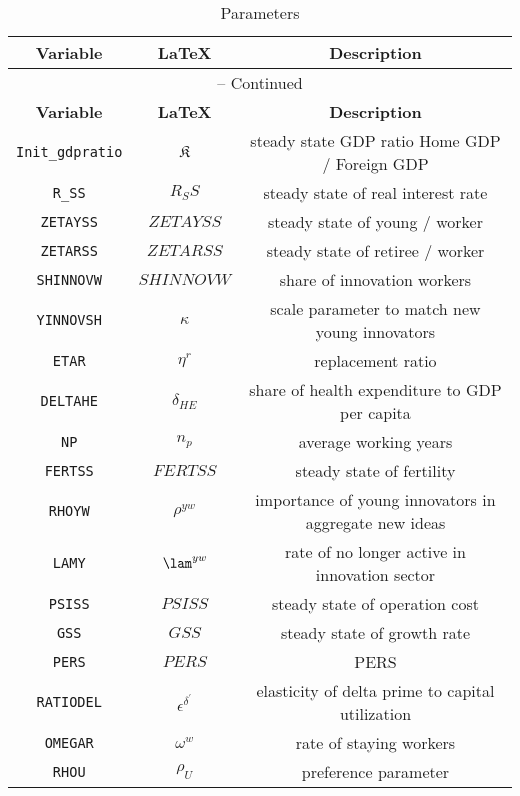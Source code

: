 \begin{center}
\begin{longtable}{ccc}
\caption{Parameters}\\%
\hline%
\multicolumn{1}{c}{\textbf{Variable}} &
\multicolumn{1}{c}{\textbf{\LaTeX}} &
\multicolumn{1}{c}{\textbf{Description}}\\%
\hline\hline%
\endfirsthead
\multicolumn{3}{c}{{\tablename} \thetable{} -- Continued}\\%
\hline%
\multicolumn{1}{c}{\textbf{Variable}} &
\multicolumn{1}{c}{\textbf{\LaTeX}} &
\multicolumn{1}{c}{\textbf{Description}}\\%
\hline\hline%
\endhead
\texttt{Init\_gdpratio} & ${\mathfrak{K}}$ & steady state GDP ratio \: Home GDP / Foreign GDP \\
\texttt{R\_SS} & ${R_SS}$ & steady state of real interest rate\\
\texttt{ZETAYSS} & ${ZETAYSS}$ & steady state of young / worker \\
\texttt{ZETARSS} & ${ZETARSS}$ & steady state of retiree / worker \\
\texttt{SHINNOVW} & ${SHINNOVW}$ & share of innovation workers\\
\texttt{YINNOVSH} & ${\kappa}$ & scale parameter to match new young innovators\\
\texttt{ETAR} & ${\eta^r}$ & replacement ratio\\
\texttt{DELTAHE} & ${\delta_{HE}}$ & share of health expenditure to GDP per capita\\
\texttt{NP} & ${n_p}$ & average working years\\
\texttt{FERTSS} & ${FERTSS}$ & steady state of fertility\\
\texttt{RHOYW} & ${\rho^{yw}}$ & importance of young innovators in aggregate new ideas\\
\texttt{LAMY} & ${\lam^{yw}}$ & rate of no longer active in innovation sector\\
\texttt{PSISS} & ${PSISS}$ & steady state of operation cost\\
\texttt{GSS} & ${GSS}$ & steady state of growth rate\\
\texttt{PERS} & $PERS$ & PERS\\
\texttt{RATIODEL} & ${\epsilon^{\delta^{\prime}}}$ & elasticity of delta prime to capital utilization\\
\texttt{OMEGAR} & ${\omega^w}$ & rate of staying workers\\
\texttt{RHOU} & ${\rho_U}$ & preference parameter\\

\end{longtable}
\end{center}
